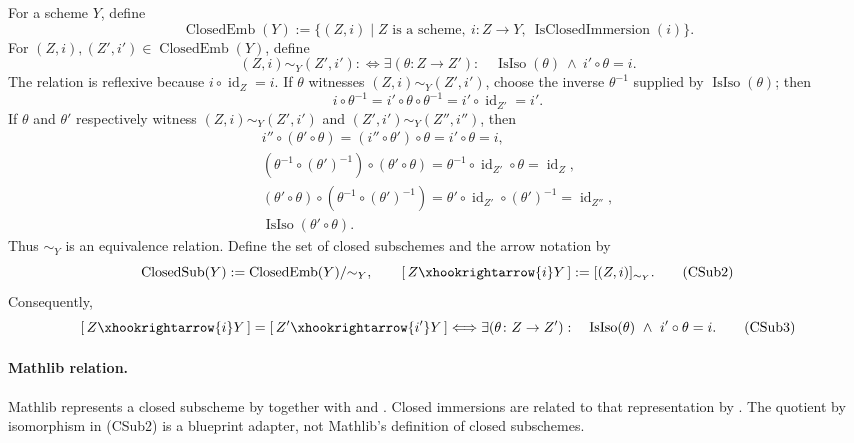 \begin{definition}
  \label{def:nagata-closed-subscheme-class}

  For a scheme \(Y\), define
  \[
    \operatorname{ClosedEmb}(Y):=
      \{(Z,i)\mid Z\text{ is a scheme},\
        i\colon Z\to Y,\
        \operatorname{IsClosedImmersion}(i)\}.                     \tag{CSub0}
  \]
  For \((Z,i),(Z',i')\in\operatorname{ClosedEmb}(Y)\), define
  \[
    (Z,i)\sim_Y(Z',i')
      :\Longleftrightarrow
      \exists(\theta\colon Z\to Z'):\quad
      \operatorname{IsIso}(\theta)\ \wedge\ i'\circ\theta=i.       \tag{CSub1}
  \]
  The relation is reflexive because
  \(i\circ\operatorname{id}_Z=i\).  If \(\theta\) witnesses
  \((Z,i)\sim_Y(Z',i')\), choose the inverse \(\theta^{-1}\) supplied by
  \(\operatorname{IsIso}(\theta)\); then
  \[
    i\circ\theta^{-1}
      =i'\circ\theta\circ\theta^{-1}
      =i'\circ\operatorname{id}_{Z'}=i'.                           \tag{CSub1a}
  \]
  If \(\theta\) and \(\theta'\) respectively witness
  \((Z,i)\sim_Y(Z',i')\) and \((Z',i')\sim_Y(Z'',i'')\), then
  \[
  \begin{gathered}
    i''\circ(\theta'\circ\theta)
      =(i''\circ\theta')\circ\theta
      =i'\circ\theta=i,\\
    (\theta^{-1}\circ(\theta')^{-1})\circ(\theta'\circ\theta)
      =\theta^{-1}\circ\operatorname{id}_{Z'}\circ\theta
      =\operatorname{id}_Z,\\
    (\theta'\circ\theta)\circ(\theta^{-1}\circ(\theta')^{-1})
      =\theta'\circ\operatorname{id}_{Z'}\circ(\theta')^{-1}
      =\operatorname{id}_{Z''},\\
    \operatorname{IsIso}(\theta'\circ\theta).
  \end{gathered}                                                     \tag{CSub1b}
  \]
  Thus \(\sim_Y\) is an equivalence relation.  Define the set of closed
  subschemes and the arrow notation by
  \[
    \operatorname{ClosedSub}(Y):=
      \operatorname{ClosedEmb}(Y)/{\sim_Y},\qquad
    [\,Z\xhookrightarrow{i}Y\,]:=[(Z,i)]_{\sim_Y}.                 \tag{CSub2}
  \]
  Consequently,
  \[
    [\,Z\xhookrightarrow{i}Y\,]
      =[\,Z'\xhookrightarrow{i'}Y\,]
    \Longleftrightarrow
    \exists(\theta\colon Z\to Z'):\quad
      \operatorname{IsIso}(\theta)\ \wedge\ i'\circ\theta=i.       \tag{CSub3}
  \]

  \paragraph{Mathlib relation.}
  Mathlib represents a closed subscheme by
  \texttt{} together with
  \texttt{} and
  \texttt{\detokenize{subschemeι}}.  Closed immersions are related to that
  representation by
  \texttt{}.
  The quotient by isomorphism in (CSub2) is a blueprint adapter, not
  Mathlib's definition of closed subschemes.
\end{definition}



